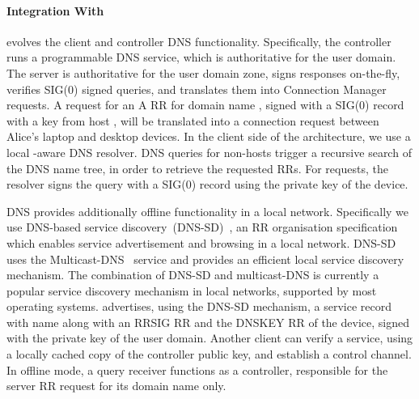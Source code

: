 
\paragraph{\signpost Integration With \dnssec} 

\signpost evolves the \signpost client and controller DNS functionality.
Specifically, the controller runs a programmable DNS service, which is
authoritative for the user domain. The server is authoritative for the
user domain zone,  signs responses on-the-fly, verifies SIG(0) signed queries, and
translates them into Connection Manager requests. A request for an A RR for
domain name , signed with a SIG(0) record with a key from
host , will be translated into a connection request between
Alice's laptop and desktop devices.  
In the client side of the \signpost architecture, we use a local \signpost-aware
DNS resolver. DNS queries for non-\signpost hosts trigger a recursive search of
the DNS name tree, in order to retrieve the requested RRs.  For \signpost 
requests, the resolver signs the query with a SIG(0) record using the private
key of the device. 

DNS provides additionally offline functionality in a local network.
Specifically we use DNS-based service discovery~(DNS-SD)~, an
RR organisation specification which enables service advertisement and browsing
in a local network. DNS-SD uses the Multicast-DNS~ service and
provides an efficient local service discovery mechanism. The combination of
DNS-SD and multicast-DNS is currently a popular service discovery mechanism in
local networks, supported by most operating systems.  \signpost
advertises, using the DNS-SD mechanism, a \signpost service record with name
 along with an RRSIG RR and the DNSKEY RR of the device,
signed with the private key of the user domain. Another \signpost client can
verify a \signpost service, using a locally cached copy of the
\signpost controller public key, and establish a control channel.  In offline
mode, a query receiver functions as a \signpost controller, responsible for the
server RR request for its domain name only.

